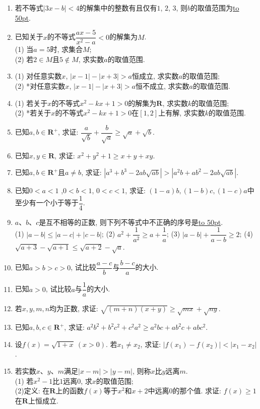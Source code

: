 \documentclass[10pt,a4paper]{article}
\newcommand{\blank}[1]{\underline{\hbox to #1pt{}}}
\begin{document}
\begin{enumerate}[1.]
\item 若不等式$|3x-b|<4$的解集中的整数有且仅有$1$, $2$, $3$, 则$b$的取值范围为\blank{50}.
\item 已知关于$x$的不等式$\dfrac{ax-5}{x^2-a}<0$的解集为$M$.\\
(1) 当$a=5$时, 求集合$M$;\\
(2) 若$2\in M$且$5\notin M$, 求实数$a$的取值范围.
\item (1) 对任意实数$x$, $|x-1|-|x+3|>a$恒成立, 求实数$a$的取值范围;\\
(2) *对任意实数$x$, $|x-1|-|x+3|>a$恒不成立, 求实数$a$的取值范围.
\item (1) 若关于$x$的不等式$x^2-kx+1>0$的解集为$\mathbf{R}$, 求实数$k$的取值范围;\\
(2) *若关于$x$的不等式$x^2-kx+1>0$在$[1,2]$上有解, 求实数$k$的取值范围.

\item 已知$a,b\in \mathbf{R}^+$, 求证: $\dfrac a{\sqrt b}+\dfrac b{\sqrt a}\ge \sqrt a+\sqrt b$.
\item 已知$x,y\in \mathbf{R}$, 求证: $x^2+y^2+1\ge x+y+xy$.
\item 已知$a,b\in \mathbf{R}^+$且$a\ne b$, 求证: $|a^3+b^3-2ab\sqrt{ab}|>|a^2b+ab^2-2ab\sqrt{ab}|$.
\item 已知$0<a<1$ ,$0<b<1$, $0<c<1$, 求证: $(1-a)b,(1-b)c,(1-c)a$中至少有一个小于等于$\dfrac 14$.
\item $a$、$b$、$c$是互不相等的正数, 则下列不等式中不正确的序号是\blank{50}.\\
(1) $|a-b|\le |a-c|+|c-b|$; (2) ${a^2}+\dfrac 1{a^2}\ge a+\dfrac 1a$; (3) $|a-b|+\dfrac 1{a-b}\ge 2$; (4) $\sqrt{a+3}-\sqrt{a+1}\le \sqrt{a+2}-\sqrt a$.
\item 已知$a>b>c>0$, 试比较$\dfrac{a-c}b$与$\dfrac{b-c}a$的大小.
\item 已知$a>0$, 试比较$a$与$\dfrac 1a$的大小.
\item 若$x,y,m,n$均为正数, 求证: $\sqrt{(m+n)(x+y)}\ge \sqrt{mx}+\sqrt{ny}$.
\item 已知$a,b,c\in \mathbf{R}^+$, 求证: $a^2b^2+b^2c^2+c^2a^2\ge a^2bc+ab^2c+abc^2$.
\item 设$f(x)=\sqrt{1+x}\ (x>0)$. 若$x_1\ne x_2$, 求证: $|f(x_1)-f(x_2)|<|x_1-x_2|$.
\item 若实数$x$、$y$、$m$满足$|x-m|>|y-m|$, 则称$x$比$y$远离$m$.\\
(1) 若$x^2-1$比$1$远离$0$, 求$x$的取值范围;\\
(2)定义: 在$\mathbf{R}$上的函数$f(x)$等于$x^2$和$x+2$中远离$0$的那个值. 求证: $f(x)\ge 1$在$\mathbf{R}$上恒成立.


\end{enumerate}
\end{document}
